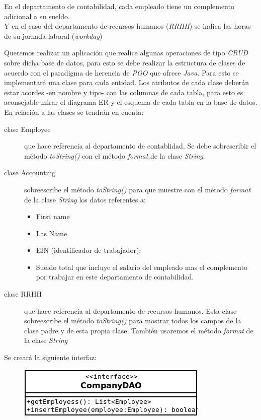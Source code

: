 \documentclass[addpoints,12pt]{exam}
\begin{document}
En el departamento de contabilidad, cada empleado tiene un complemento adicional a su sueldo.\\
Y en el caso del departamento de recursos humanos (\emph{RRHH}) se indica las horas de su jornada laboral (\emph{workday})
\newpage
\begin{questions}
\question Queremos realizar un aplicación que realice algunas operaciones de tipo \emph{CRUD} sobre dicha base de datos, para esto se debe realizar la estructura de clases de acuerdo con el paradigma de herencia de \emph{POO} que ofrece \emph{Java}. Para esto se implementará una clase para cada entidad. Los atributos de cada clase deberán estar acordes -en nombre y tipo- con las columnas de cada tabla, para esto es aconsejable mirar el diagrama ER y el esquema de cada tabla en la base de datos. En relación a las clases se tendrán en cuenta:
\begin{description}
\item[clase Employee] que hace referencia al departamento de contablidad. Se debe sobrescribir el método \emph{toString()} con el método \emph{format} de la clase \emph{String}. 
\item[clase Accounting] sobreescribe el método \emph{toString()} para que muestre con el método \emph{format} de la clase \emph{String} los datos referentes a:
\begin{itemize}
\item First name
\item Las Name
\item EIN (identificador de trabajador);
\item Sueldo total que incluye el salario del empleado mas el complemento por trabajar en este departamento de contabilidad.
\end{itemize}
\item[clase RRHH] que hace referencia al departamento de recursos humanos. Esta clase sobreescribe el método \emph{toString()} para mostrar todos los campos de la clase padre y de esta propia clase. También usaremos el método \emph{format} de la clase \emph{String}
\end{description}
Se creará la siguiente interfaz:
\begin{figure}[h]
\begin{center}
\includegraphics[scale=0.7]{dao2.png}

\end{center}
\end{figure}
\end{questions}
\end{document}
